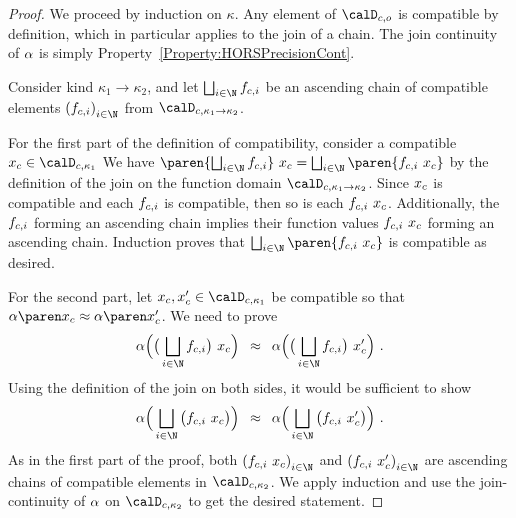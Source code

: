 \documentclass[../../diss.tex]{subfiles}
\begin{document}
\begin{proof}
    We proceed by induction on $\kappa$.
    Any element of $\domainc{\ground}$ is compatible by definition, which in particular applies to the join of a chain.
    The join continuity of $\abs$ is simply Property~{\ref{Property:HORSPrecisionCont}}.

    Consider kind $\kappa_1 \to \kappa_2$, and let $\bigsqcup_{i \in \N} \fci$ be an ascending chain of compatible elements ${(\fci)}_{i \in \N}$ from $\domainc{\kappa_1 \to \kappa_2}$.

    For the first part of the definition of compatibility, consider a compatible $\xc \in \domainc{\kappa_1}$
    We have
    \(
        \paren{ \bigsqcup_{i \in \N} \fci } \appl \xc
        =
        \bigsqcup_{i \in \N} \paren{\fci \appl \xc}
    \)
    by the definition of the join on the function domain $\domainc{\kappa_1 \to \kappa_2}$.
    Since $x_c$ is compatible and each $f_{c,i}$ is compatible, then so is each $f_{c,i} \  x_c$.
    Additionally, the $f_{c,i}$ forming an ascending chain implies their function values $f_{c,i} \  x_c$ forming an ascending chain.
    Induction proves that $\bigsqcup_{i \in \N} \paren{\fci \appl \xc}$ is compatible as desired.

    For the second part, let $\xc, \xc' \in \domainc{\kappa_1}$ be compatible so that $\abs{\xc} \approx \abs{\xc'}$.
    We need to prove
    \[
        \abs \Big( \big( \bigsqcup_{i \in \N} \fci \big) \appl \xc \Big)
        \enspace
        \approx
        \enspace
        \abs \Big( \big( \bigsqcup_{i \in \N} \fci \big) \appl \xc' \Big)
        \ .
    \]
    Using the definition of the join on both sides, it would be sufficient to show
    \[
        \abs \Big( \bigsqcup_{i \in \N} \big(  \fci \appl \xc  \big) \Big)
        \enspace
        \approx
        \enspace
        \abs \Big( \bigsqcup_{i \in \N} \big(  \fci  \appl \xc' \big) \Big)
        \ .
    \]
    As in the first part of the proof, both ${(\fci \appl \xc)}_{i \in \N}$ and ${(\fci \appl \xc')}_{i \in \N}$ are ascending chains of compatible elements in $\domainc{\kappa_2}$.
    We apply induction and use the join-continuity of $\abs$ on $\domainc{\kappa_2}$ to get the desired statement.


\end{proof}
\end{document}
